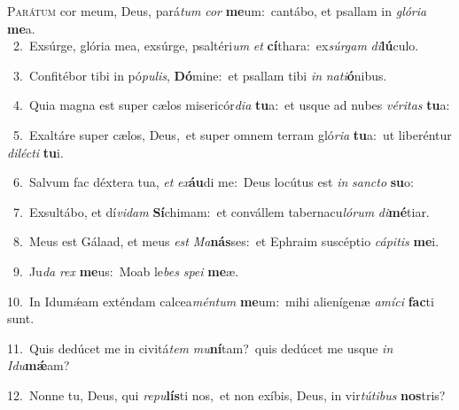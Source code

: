\lettrine{\initial\textcolor{\initialcolor}{P}}{arátum} cor meum, Deus, pará\textit{tum} \textit{cor} \textbf{me}\-um:~\star cantábo, et psallam in \textit{gló}\-\textit{ri}\textit{a} \textbf{me}\-a.\\
{\numbfont\textcolor{\numbcolor}{~2.}}~Exsúrge, glória mea, exsúrge, psaltéri\textit{um} \textit{et} \textbf{cí}\-thara:~\star ex\-\textit{súr}\-\textit{gam} \textit{di}\-\textbf{lú}culo.\par
{\numbfont\textcolor{\numbcolor}{~3.}}~Confitébor tibi in pó\-\textit{pu}\-\textit{lis}, \textbf{Dó}\-mine:~\star et psallam tibi \textit{in} \textit{na}\-\textit{ti}\textbf{ó}nibus.\par
{\numbfont\textcolor{\numbcolor}{~4.}}~Quia magna est super cælos misericór\-\textit{di}\-\textit{a} \textbf{tu}\-a:~\star et usque ad nubes \textit{vé}\-\textit{ri}\textit{tas} \textbf{tu}\-a:\par
{\numbfont\textcolor{\numbcolor}{~5.}}~Exaltáre super cælos, Deus,~\dagger et super omnem terram gló\-\textit{ri}\-\textit{a} \textbf{tu}\-a:~\star ut liberéntur \textit{di}\-\textit{léc}\textit{ti} \textbf{tu}\-i.\par
{\numbfont\textcolor{\numbcolor}{~6.}}~Salvum fac déxtera tua, \textit{et} \textit{ex}\-\textbf{áu}di me:~\star Deus locútus est \textit{in} \textit{sanc}\-\textit{to} \textbf{su}\-o:\par
{\numbfont\textcolor{\numbcolor}{~7.}}~Exsultábo, et dí\-\textit{vi}\-\textit{dam} \textbf{Sí}\-chimam:~\star et convállem tabernacu\-\textit{ló}\-\textit{rum} \textit{di}\-\textbf{mé}tiar.\par
{\numbfont\textcolor{\numbcolor}{~8.}}~Meus est Gálaad, et meus \textit{est} \textit{Ma}\-\textbf{nás}ses:~\star et Ephraim suscéptio \textit{cá}\-\textit{pi}\textit{tis} \textbf{me}\-i.\par
{\numbfont\textcolor{\numbcolor}{~9.}}~Ju\textit{da} \textit{rex} \textbf{me}\-us:~\star Moab le\textit{bes} \textit{spe}\-\textit{i} \textbf{me}\-æ.\par
{\numbfont\textcolor{\numbcolor}{10.}}~In Idumǽam exténdam calcea\-\textit{mén}\-\textit{tum} \textbf{me}\-um:~\star mihi alienígenæ \textit{a}\-\textit{mí}\textit{ci} \textbf{fac}\-ti sunt.\par
{\numbfont\textcolor{\numbcolor}{11.}}~Quis dedúcet me in civitá\textit{tem} \textit{mu}\-\textbf{ní}tam?~\star quis dedúcet me usque \textit{in} \textit{I}\-\textit{du}\textbf{mǽ}am?\par
{\numbfont\textcolor{\numbcolor}{12.}}~Nonne tu, Deus, qui \textit{re}\-\textit{pu}\textbf{lís}ti nos,~\star et non exíbis, Deus, in vir\-\textit{tú}\-\textit{ti}\textit{bus} \textbf{nos}\-tris?\par
